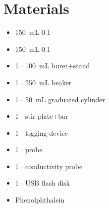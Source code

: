 \documentclass[a4paper]{article}
\newcommand{\pH}{\text{pH}}
\begin{document}
    \section{Materials}
        \begin{itemize}
            \item \SI{150}{\mL} \SI{0.1}{\Molar} 
            \item \SI{150}{\mL} \SI{0.1}{\Molar} 
            \item 1 $\cdot$ \SI{100}{\mL} buret$+$stand
            \item 1 $\cdot$ \SI{250}{\mL} beaker
            \item 1 $\cdot$ \SI{50}{\mL} graduated cylinder
            \item 1 $\cdot$ stir plate$+$bar
            \item 1 $\cdot$ logging device
            \item 1 $\cdot$ \pH{} probe
            \item 1 $\cdot$ conductivity probe
            \item 1 $\cdot$ USB flash disk
            \item Phenolphthalein
        \end{itemize}
\end{document}
